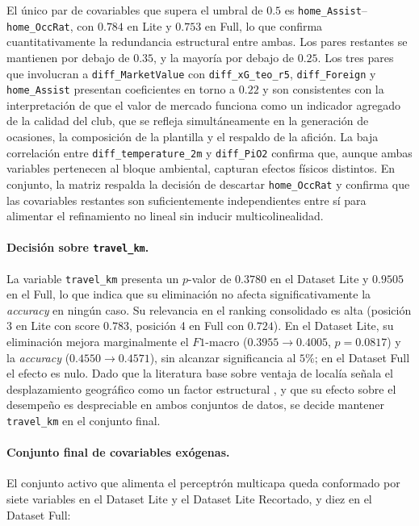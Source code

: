El \'unico par de covariables que supera el umbral de $0{.}5$ es \texttt{home\_Assist}--\texttt{home\_OccRat}, con $0{.}784$ en Lite y $0{.}753$ en Full, lo que confirma cuantitativamente la redundancia estructural entre ambas. Los pares restantes se mantienen por debajo de $0{.}35$, y la mayor\'ia por debajo de $0{.}25$. Los tres pares que involucran a \texttt{diff\_MarketValue} con \texttt{diff\_xG\_teo\_r5}, \texttt{diff\_Foreign} y \texttt{home\_Assist} presentan coeficientes en torno a $0{.}22$ y son consistentes con la interpretaci\'on de que el valor de mercado funciona como un indicador agregado de la calidad del club, que se refleja simult\'aneamente en la generaci\'on de ocasiones, la composici\'on de la plantilla y el respaldo de la afici\'on. La baja correlaci\'on entre \texttt{diff\_temperature\_2m} y \texttt{diff\_PiO2} confirma que, aunque ambas variables pertenecen al bloque ambiental, capturan efectos f\'isicos distintos. En conjunto, la matriz respalda la decisi\'on de descartar \texttt{home\_OccRat} y confirma que las covariables restantes son suficientemente independientes entre s\'i para alimentar el refinamiento no lineal sin inducir multicolinealidad.

\paragraph{Decisi\'on sobre \texttt{travel\_km}.} La variable \texttt{travel\_km} presenta un $p$-valor de $0{.}3780$ en el Dataset Lite y $0{.}9505$ en el Full, lo que indica que su eliminaci\'on no afecta significativamente la \emph{accuracy} en ning\'un caso. Su relevancia en el ranking consolidado es alta (posici\'on 3 en Lite con score $0{.}783$, posici\'on 4 en Full con $0{.}724$). En el Dataset Lite, su eliminaci\'on mejora marginalmente el $F1$-macro ($0{.}3955 \to 0{.}4005$, $p = 0{.}0817$) y la \emph{accuracy} ($0{.}4550 \to 0{.}4571$), sin alcanzar significancia al $5\%$; en el Dataset Full el efecto es nulo. Dado que la literatura base sobre ventaja de local\'ia se\~nala el desplazamiento geogr\'afico como un factor estructural \cite{Glicko2Mod}, y que su efecto sobre el desempe\~no es despreciable en ambos conjuntos de datos, se decide mantener \texttt{travel\_km} en el conjunto final.

\paragraph{Conjunto final de covariables ex\'ogenas.} El conjunto activo que alimenta el perceptr\'on multicapa queda conformado por siete variables en el Dataset Lite y el Dataset Lite Recortado, y diez en el Dataset Full:

